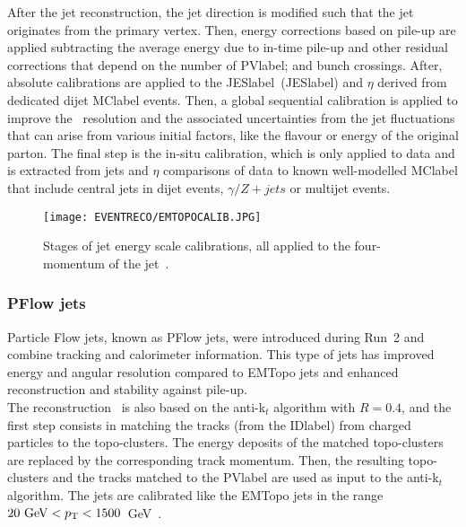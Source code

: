 After the jet reconstruction, the jet direction is modified such that the jet originates from the primary vertex. Then, energy corrections based on pile-up are applied subtracting the average energy due to in-time pile-up and other residual corrections that depend on the number of \acrshort{PVlabel}; and bunch crossings. After, absolute calibrations are applied to the \acrlong{JESlabel}~(\acrshort{JESlabel}) and $\eta$ derived from dedicated dijet \acrshort{MClabel} events. Then, a global sequential calibration is applied to improve the \pT\ resolution and the associated uncertainties from the jet fluctuations that can arise from various initial factors, like the flavour or energy of the original parton. The final step is the in-situ calibration, which is only applied to data and is extracted from jets \pT and $\eta$ comparisons of data to known well-modelled \acrshort{MClabel} that include central jets in dijet events, $\gamma/Z+jets$ or multijet events.\\

\begin{figure}[htbp]
    \RawFloats
    \begin{center}
    \texttt{[image: EVENTRECO/EMTOPOCALIB.JPG]}
    \caption{
        Stages of jet energy scale calibrations, all applied to the four-momentum of the jet~\cite{ATLAS_Collaboration2020-ip}. 
    }
    \label{figEVNTRECO:EMTOPO}
    \end{center}
\end{figure}
\subsubsection{PFlow jets}

Particle Flow jets, known as PFlow jets, were introduced during Run~2 and combine tracking and calorimeter information. This type of jets has improved energy and angular resolution compared to EMTopo jets and enhanced reconstruction and stability against pile-up.\\

The reconstruction~\cite{pflow} is also based on the anti-k$_t$ algorithm with $R=0.4$, and the first step consists in matching the tracks (from the \acrshort{IDlabel}) from charged particles to the topo-clusters. The energy deposits of the matched topo-clusters are replaced by the corresponding track momentum. Then, the resulting topo-clusters and the tracks matched to the \acrshort{PVlabel} are used as input to the anti-k$_t$ algorithm. The jets are calibrated like the EMTopo jets in the range $20\text{ GeV}<p_{\text{T}}<1500$~GeV~\cite{ATLAS_Collaboration2020-ip}. 

